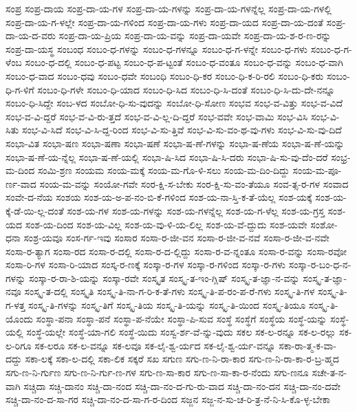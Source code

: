 {ಸಂಪ್ರ
ಸಂಪ್ರ-ದಾಯ
ಸಂಪ್ರ-ದಾ-ಯ-ಗಳ
ಸಂಪ್ರ-ದಾ-ಯ-ಗಳನ್ನು
ಸಂಪ್ರ-ದಾ-ಯ-ಗಳನ್ನೆಲ್ಲ
ಸಂಪ್ರ-ದಾ-ಯ-ಗಳಲ್ಲಿ
ಸಂಪ್ರ-ದಾ-ಯ-ಗ-ಳಲ್ಲೇ
ಸಂಪ್ರ-ದಾ-ಯ-ಗಳಿಂದ
ಸಂಪ್ರ-ದಾ-ಯ-ಗಳು
ಸಂಪ್ರ-ದಾ-ಯದ
ಸಂಪ್ರ-ದಾ-ಯ-ದಂತೆ
ಸಂಪ್ರ-ದಾ-ಯ-ದ-ವರು
ಸಂಪ್ರ-ದಾ-ಯ-ಪ್ರಿಯ
ಸಂಪ್ರ-ದಾ-ಯ-ವನ್ನು
ಸಂಪ್ರ-ದಾ-ಯವೇ
ಸಂಪ್ರ-ದಾ-ಯ-ಶ-ರ-ಣ-ರನ್ನು
ಸಂಪ್ರ-ದಾ-ಯಸ್ಥ
ಸಂಬಂಧ
ಸಂಬಂ-ಧ-ಗಳನ್ನು
ಸಂಬಂ-ಧ-ಗಳನ್ನೂ
ಸಂಬಂ-ಧ-ಗ-ಳನ್ನೇ
ಸಂಬಂ-ಧ-ಗಳು
ಸಂಬಂ-ಧ-ಗ-ಳೆಂಬ
ಸಂಬಂ-ಧ-ದಲ್ಲಿ
ಸಂಬಂ-ಧ-ಪಟ್ಟ
ಸಂಬಂ-ಧ-ಪ-ಟ್ಟಂತೆ
ಸಂಬಂ-ಧ-ವಂತೂ
ಸಂಬಂ-ಧ-ವನ್ನು
ಸಂಬಂ-ಧ-ವಾಗಿ
ಸಂಬಂ-ಧ-ವಾದ
ಸಂಬಂ-ಧವು
ಸಂಬಂ-ಧವೇ
ಸಂಬಂಧಿ
ಸಂಬಂ-ಧಿ-ಕರ
ಸಂಬಂ-ಧಿ-ಕ-ರಿ-ರಲಿ
ಸಂಬಂ-ಧಿ-ಕರು
ಸಂಬಂ-ಧಿ-ಗ-ಳಿಗೆ
ಸಂಬಂ-ಧಿ-ಗಳೇ
ಸಂಬಂ-ಧಿ-ಯಾದ
ಸಂಬಂ-ಧಿ-ಸಿದ
ಸಂಬಂ-ಧಿ-ಸಿ-ದಂತೆ
ಸಂಬಂ-ಧಿ-ಸಿ-ದು-ದೇ-ನನ್ನೂ
ಸಂಬಂ-ಧಿ-ಸಿದ್ದೇ
ಸಂಬ-ಳದ
ಸಂಬೋ-ಧಿ-ಸು-ವುದನ್ನು
ಸಂಬೋ-ಧಿ-ಸೋಣ
ಸಂಭವ
ಸಂಭ-ವ-ವಿತ್ತು
ಸಂಭ-ವ-ವಿದೆ
ಸಂಭ-ವ-ವಿ-ದ್ದರೆ
ಸಂಭ-ವ-ವಿ-ರು-ತ್ತದೆ
ಸಂಭ-ವ-ವಿ-ಲ್ಲ-ದಿ-ದ್ದರೆ
ಸಂಭ-ವವೇ
ಸಂಭ-ವಾಮಿ
ಸಂಭ-ವಿಸಿ
ಸಂಭ-ವಿ-ಸಿತು
ಸಂಭ-ವಿ-ಸಿದೆ
ಸಂಭ-ವಿ-ಸಿ-ದ್ದ-ರಿಂದ
ಸಂಭ-ವಿ-ಸು-ತ್ತಿವೆ
ಸಂಭ-ವಿ-ಸು-ವಂ-ಥ-ವು-ಗಳು
ಸಂಭ-ವಿ-ಸು-ವು-ದಿದೆ
ಸಂಭಾ-ವಿತ
ಸಂಭಾ-ಷಣ
ಸಂಭಾ-ಷಣಾ
ಸಂಭಾ-ಷಣೆ
ಸಂಭಾ-ಷ-ಣೆ-ಗಳನ್ನು
ಸಂಭಾ-ಷ-ಣೆಯ
ಸಂಭಾ-ಷ-ಣೆ-ಯನ್ನು
ಸಂಭಾ-ಷ-ಣೆ-ಯ-ನ್ನೆಲ್ಲ
ಸಂಭಾ-ಷ-ಣೆ-ಯಲ್ಲಿ
ಸಂಭಾ-ಷಿ-ಸಿದ
ಸಂಭಾ-ಷಿ-ಸಿ-ದರು
ಸಂಭಾ-ಷಿ-ಸು-ವು-ದೆಂ-ದರೆ
ಸಂಭ್ರ-ಮ-ದಿಂದ
ಸಂಮಿ-ಶ್ರಣ
ಸಂಯಮ
ಸಂಯ-ಮಕ್ಕೆ
ಸಂಯ-ಮ-ಗೊ-ಳಿ-ಸಲು
ಸಂಯ-ಮ-ದಿಂ-ದಿದ್ದು
ಸಂಯ-ಮ-ಪೂ-ರ್ಣ-ವಾದ
ಸಂಯ-ಮ-ವನ್ನು
ಸಂಯೋ-ಗವೇ
ಸಂರ-ಕ್ಷಿ-ಸ-ಬೇಕು
ಸಂರ-ಕ್ಷಿ-ಸು-ವಂ-ತೆಯೂ
ಸಂವ-ತ್ಸ-ರ-ಗಳ
ಸಂವಾದ
ಸಂವೇ-ದ-ನೆಯ
ಸಂಶಯ
ಸಂಶ-ಯ-ಅ-ಪ-ನಂ-ಬಿ-ಕೆ-ಗಳಿಂದ
ಸಂಶ-ಯ-ನಾ-ಸ್ತಿ-ಕ-ತೆ-ಯೆಲ್ಲ
ಸಂಶ-ಯಕ್ಕೆ
ಸಂಶ-ಯ-ಕ್ಕೆ-ಡೆ-ಯಿ-ಲ್ಲ-ದಂತೆ
ಸಂಶ-ಯ-ಗಳ
ಸಂಶ-ಯ-ಗಳನ್ನು
ಸಂಶ-ಯ-ಗಳನ್ನೆಲ್ಲ
ಸಂಶ-ಯ-ಗ-ಳೆಲ್ಲ
ಸಂಶ-ಯ-ಗ್ರಸ್ತ
ಸಂಶ-ಯದ
ಸಂಶ-ಯ-ದಿಂದ
ಸಂಶ-ಯ-ವಿಲ್ಲ
ಸಂಶ-ಯ-ವು-ಳಿ-ಯ-ಲಿಲ್ಲ
ಸಂಶ-ಯ-ವೆ-ದ್ದುದು
ಸಂಶ-ಯವೇ
ಸಂಶೋ-ಧನಾ
ಸಂಶ್ರ-ಯವೂ
ಸಂಸ-ರ್ಗ-ಇವು
ಸಂಸಾರ
ಸಂಸಾ-ರ-ಜೀ-ವನ
ಸಂಸಾ-ರ-ಜೀ-ವ-ನವೆ
ಸಂಸಾ-ರ-ಜೀ-ವ-ನವೇ
ಸಂಸಾ-ರ-ತ್ಯಾಗ
ಸಂಸಾ-ರದ
ಸಂಸಾ-ರ-ದಲ್ಲಿ
ಸಂಸಾ-ರ-ದ-ಲ್ಲಿದ್ದು
ಸಂಸಾ-ರ-ವ-ನ್ನಂತೂ
ಸಂಸಾ-ರ-ವನ್ನು
ಸಂಸಾ-ರವೋ
ಸಂಸಾ-ರಿ-ಗಳ
ಸಂಸಾ-ರಿ-ಯಾದ
ಸಂಸ್ಕ-ರ-ಣಕ್ಕೆ
ಸಂಸ್ಕಾ-ರ-ಗಳ
ಸಂಸ್ಕಾ-ರ-ಗಳಿಂದ
ಸಂಸ್ಕಾ-ರ-ಗಳು
ಸಂಸ್ಕಾ-ರ-ಬಂ-ಧ-ನ-ಗಳನ್ನು
ಸಂಸ್ಕಾ-ರ-ರಾ-ಶಿ-ಯನ್ನು
ಸಂಸ್ಕಾ-ರವೇ
ಸಂಸ್ಕೃತ
ಸಂಸ್ಕೃ-ತ-ಇಂ-ಗ್ಲಿಷ್
ಸಂಸ್ಕೃ-ತ-ಜ್ಞಾ-ನ-ವನ್ನು
ಸಂಸ್ಕೃ-ತ-ಜ್ಞಾ-ನವೂ
ಸಂಸ್ಕೃ-ತ-ದಲ್ಲಿ
ಸಂಸ್ಕೃತಿ
ಸಂಸ್ಕೃ-ತಿ-ನಾ-ಗ-ರಿ-ಕ-ತೆ-ಗಳು
ಸಂಸ್ಕೃ-ತಿ-ಪ-ರಂ-ಪ-ರೆ-ಗಳು
ಸಂಸ್ಕೃ-ತಿ-ಗಳ
ಸಂಸ್ಕೃ-ತಿ-ಗ-ಳತ್ತ
ಸಂಸ್ಕೃ-ತಿ-ಗಳನ್ನು
ಸಂಸ್ಕೃ-ತಿಗೆ
ಸಂಸ್ಕೃ-ತಿಯ
ಸಂಸ್ಕೃ-ತಿ-ಯನ್ನು
ಸಂಸ್ಕೃ-ತಿ-ಯಿಂದ
ಸಂಸ್ಕೃ-ತಿಯೂ
ಸಂಸ್ಕೃ-ತಿ-ಯೊಂದು
ಸಂಸ್ಥಾ-ಪನಾ
ಸಂಸ್ಥಾ-ಪನೆ
ಸಂಸ್ಥಾ-ಪ-ನೆಯೇ
ಸಂಸ್ಥಾ-ಪಿ-ಸುವ
ಸಂಸ್ಥೆ
ಸಂಸ್ಥೆಗೆ
ಸಂಸ್ಥೆಯ
ಸಂಸ್ಥೆ-ಯನ್ನು
ಸಂಸ್ಥೆ-ಯಲ್ಲಿ
ಸಂಸ್ಥೆ-ಯಲ್ಲೇ
ಸಂಸ್ಥೆ-ಯಾ-ಗಲಿ
ಸಂಸ್ಥೆ-ಯಿದು
ಸಂಸ್ವ-ರ್ಶ-ವೆ-ನ್ನು-ವುದು
ಸಕಲ
ಸಕ-ಲ-ರನ್ನೂ
ಸಕ-ಲ-ರಲ್ಲು
ಸಕ-ಲ-ರಿಗೂ
ಸಕ-ಲರೂ
ಸಕ-ಲ-ವನ್ನೂ
ಸಕ-ಲವೂ
ಸಕ-ಲೈ-ಶ್ವ-ರ್ಯದ
ಸಕ-ಲೈ-ಶ್ವ-ರ್ಯ-ವನ್ನೂ
ಸಕಾ-ರಾ-ತ್ಮ-ಕ-ವಾ-ದದ್ದು
ಸಕಾ-ಲಕ್ಕೆ
ಸಕಾ-ಲ-ದಲ್ಲಿ
ಸಕಾ-ಲಿಕ
ಸಕ್ಕರೆ
ಸಖ
ಸಗುಣ
ಸಗು-ಣ-ನಿ-ರಾ-ಕಾರ
ಸಗು-ಣ-ನಿ-ರಾ-ಕಾ-ರ-ಬ್ರ-ಹ್ಮದ
ಸಗು-ಣ-ನಿ-ರ್ಗುಣ
ಸಗು-ಣ-ನಿ-ರ್ಗು-ಣ-ಗಳ
ಸಗು-ಣ-ಸಾ-ಕಾರ
ಸಗು-ಣ-ಸಾ-ಕಾ-ರ-ನೆಂದು
ಸಗು-ಣನೂ
ಸಚೇ-ತ-ನ-ವಾಗಿ
ಸಚ್ಚಿದಾ
ಸಚ್ಚಿ-ದಾನಂ
ಸಚ್ಚಿ-ದಾ-ನಂದ
ಸಚ್ಚಿ-ದಾ-ನಂ-ದ-ಗು-ರು-ವಾದ
ಸಚ್ಚಿ-ದಾ-ನಂ-ದನ
ಸಚ್ಚಿ-ದಾ-ನಂ-ದವೇ
ಸಚ್ಚಿ-ದಾ-ನಂ-ದ-ಸಾ-ಗರ
ಸಚ್ಚಿ-ದಾ-ನಂ-ದ-ಸಾ-ಗ-ರ-ದಿಂದ
ಸಜ್ಜನ
ಸಜ್ಜ-ನ-ಸು-ಚ-ರಿ-ತ್ರ-ನೆ-ನಿ-ಸಿ-ಕೊ-ಳ್ಳ-ಬೇಕಾ
}
